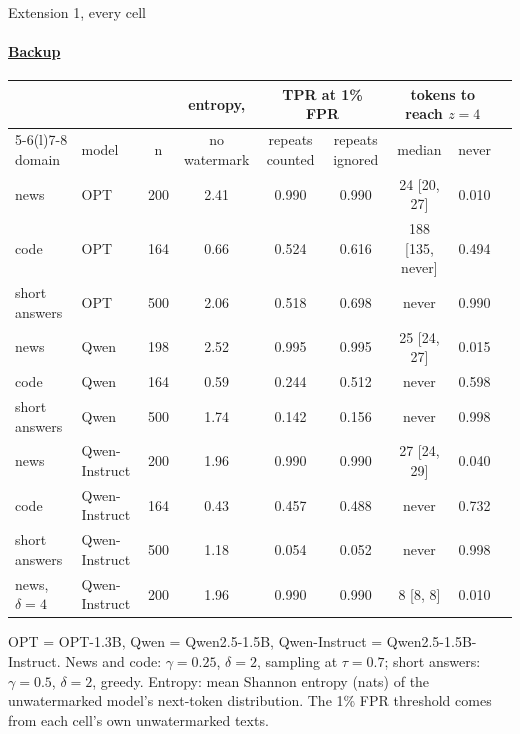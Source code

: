 \documentclass[aspectratio=169,10pt,t]{beamer}
\begin{document}
\begin{frame}[label=b13]{Extension 1, every cell}
  \framesubtitle{\hyperlink{b0}{Backup}}
  \scriptsize
  \begin{center}
  \begin{tabular}{@{}llccccccc@{}}
    \toprule
     & & & entropy, & \multicolumn{2}{c}{TPR at 1\% FPR} & \multicolumn{2}{c}{tokens to reach $z = 4$} \\
    \cmidrule(lr){5-6}\cmidrule(l){7-8}
    domain & model & n & no watermark & repeats counted & repeats ignored & median & never \\
    \midrule
    news & OPT & 200 & 2.41 & 0.990 & 0.990 & 24 [20, 27] & 0.010 \\
    code & OPT & 164 & 0.66 & 0.524 & 0.616 & 188 [135, never] & 0.494 \\
    short answers & OPT & 500 & 2.06 & 0.518 & 0.698 & never & 0.990 \\
    \midrule
    news & Qwen & 198 & 2.52 & 0.995 & 0.995 & 25 [24, 27] & 0.015 \\
    code & Qwen & 164 & 0.59 & 0.244 & 0.512 & never & 0.598 \\
    short answers & Qwen & 500 & 1.74 & 0.142 & 0.156 & never & 0.998 \\
    \midrule
    news & Qwen-Instruct & 200 & 1.96 & 0.990 & 0.990 & 27 [24, 29] & 0.040 \\
    code & Qwen-Instruct & 164 & 0.43 & 0.457 & 0.488 & never & 0.732 \\
    short answers & Qwen-Instruct & 500 & 1.18 & 0.054 & 0.052 & never & 0.998 \\
    news, $\delta = 4$ & Qwen-Instruct & 200 & 1.96 & 0.990 & 0.990 & 8 [8, 8] & 0.010 \\
    \bottomrule
  \end{tabular}
  \end{center}
  \vspace{0.3em}
  \small
  OPT = OPT-1.3B, Qwen = Qwen2.5-1.5B, Qwen-Instruct = Qwen2.5-1.5B-Instruct. News and code: $\gamma = 0.25$, $\delta = 2$, sampling at $\tau = 0.7$; short answers: $\gamma = 0.5$, $\delta = 2$, greedy. Entropy: mean Shannon entropy (nats) of the unwatermarked model's next-token distribution. The 1\% FPR threshold comes from each cell's own unwatermarked texts.
\end{frame}
\end{document}
